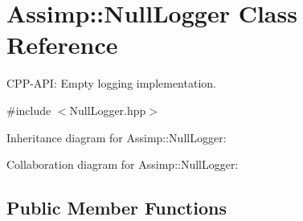 \hypertarget{class_assimp_1_1_null_logger}{\section{Assimp\+:\+:Null\+Logger Class Reference}
\label{class_assimp_1_1_null_logger}
}


C\+P\+P-\/\+A\+P\+I\+: Empty logging implementation.  




{\ttfamily \#include $<$Null\+Logger.\+hpp$>$}



Inheritance diagram for Assimp\+:\+:Null\+Logger\+:


Collaboration diagram for Assimp\+:\+:Null\+Logger\+:
\subsection*{Public Member Functions}
